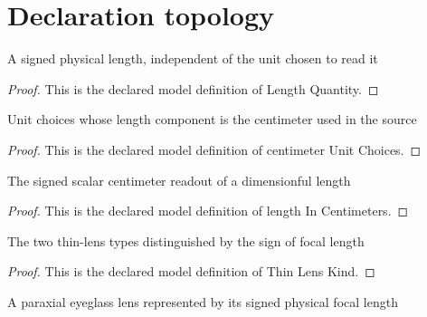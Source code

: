 \section{Declaration topology}
\begin{definition}
  \label{def:physics:phyx-mini-0045:phyxminiproblems-problemphyxmini0045-lengthquantity}
  A signed physical length, independent of the unit chosen to read it
\end{definition}
\begin{proof}
  This is the declared model definition of Length Quantity.
\end{proof}
\begin{definition}
  \label{def:physics:phyx-mini-0045:phyxminiproblems-problemphyxmini0045-centimeterunitchoices}
  Unit choices whose length component is the centimeter used in the source
\end{definition}
\begin{proof}
  This is the declared model definition of centimeter Unit Choices.
\end{proof}
\begin{definition}
  \label{def:physics:phyx-mini-0045:phyxminiproblems-problemphyxmini0045-lengthincentimeters}
  The signed scalar centimeter readout of a dimensionful length
\end{definition}
\begin{proof}
  This is the declared model definition of length In Centimeters.
\end{proof}
\begin{definition}
  \label{def:physics:phyx-mini-0045:phyxminiproblems-problemphyxmini0045-thinlenskind}
  The two thin-lens types distinguished by the sign of focal length
\end{definition}
\begin{proof}
  This is the declared model definition of Thin Lens Kind.
\end{proof}
\begin{definition}
  \label{def:physics:phyx-mini-0045:phyxminiproblems-problemphyxmini0045-eyeglasslens}
  A paraxial eyeglass lens represented by its signed physical focal length
\end{definition}
